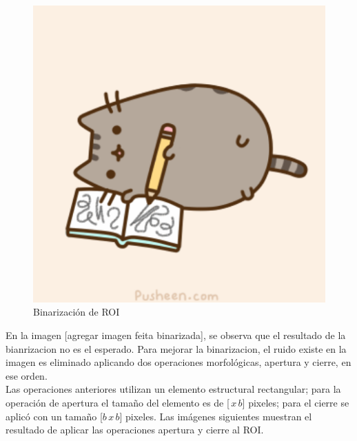 \begin{figure}[h!]
\begin{center}
\includegraphics[scale=.5]{./Figures/pusheen.png}
\end{center}
\caption{Binarización de ROI}
\label{fig:BinarizationRoi}
\end{figure} 

En la imagen [agregar imagen feita binarizada], se observa que el resultado de la bianrizacion no es el esperado. Para mejorar la binarizacion, el ruido existe en la imagen es eliminado aplicando dos operaciones morfológicas, apertura y cierre, en ese orden.\\
Las operaciones anteriores utilizan un elemento estructural rectangular; para la operación de apertura el tamaño del elemento es de [$ \, x \, b$] pixeles; para el cierre se aplic\'o con un tamaño  [$b\, x \, b$] pixeles.
Las imágenes siguientes muestran el resultado de aplicar las operaciones apertura y cierre al ROI.  

